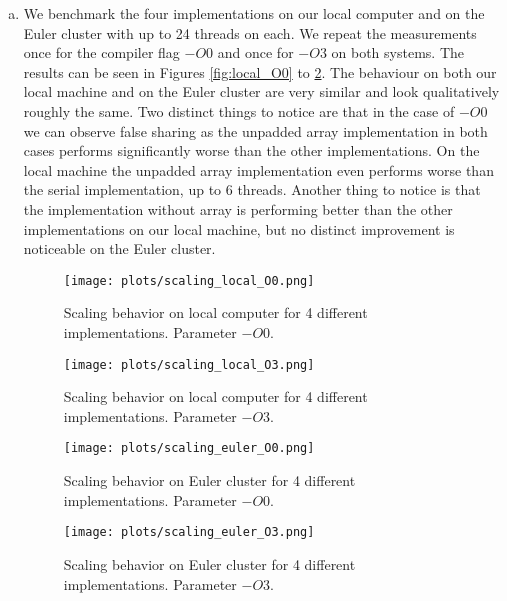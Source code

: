 \documentclass[a4paper,10pt]{article} %
\begin{document}
\begin{enumerate}[b)]
\setcounter{enumi}{0}
\item

We benchmark the four implementations on our local computer and on the Euler cluster with up to 24 threads on each. We repeat the measurements once for the compiler flag $-O0$ and once for $-O3$ on both systems. The results can be seen in Figures \ref{fig:local_O0} to \ref{fig:euler_O3}. The behaviour on both our local machine and on the Euler cluster are very similar and look qualitatively roughly the same. Two distinct things to notice are that in the case of $-O0$ we can observe false sharing as the unpadded array implementation in both cases performs significantly worse than the other implementations. On the local machine the unpadded array implementation even performs worse than the serial implementation, up to 6 threads. Another thing to notice is that the implementation without array is performing better than the other implementations on our local machine, but no distinct improvement is noticeable on the Euler cluster. 

\begin{figure}[h]
  \centering
  \begin{minipage}[t]{0.45\textwidth}
    \texttt{[image: plots/scaling\_local\_O0.png]}
    \caption{Scaling behavior on local computer for 4 different implementations. Parameter $-O0$.}
    \label{fig:local_O0}
  \end{minipage}
  \hfill
  \begin{minipage}[t]{0.45\textwidth}
    \texttt{[image: plots/scaling\_local\_O3.png]}
    \caption{Scaling behavior on local computer for 4 different implementations. Parameter $-O3$.}
    \label{fig:local_O3}
  \end{minipage}
\end{figure}

\begin{figure}[h]
  \centering
  \begin{minipage}[t]{0.45\textwidth}
    \texttt{[image: plots/scaling\_euler\_O0.png]}
    \caption{Scaling behavior on Euler cluster for 4 different implementations. Parameter $-O0$.}
    \label{fig:euler_O0}
  \end{minipage}
  \hfill
  \begin{minipage}[t]{0.45\textwidth}
    \texttt{[image: plots/scaling\_euler\_O3.png]}
    \caption{Scaling behavior on Euler cluster for 4 different implementations. Parameter $-O3$.}
    \label{fig:euler_O3}
  \end{minipage}
\end{figure}


\end{enumerate}
\end{document}
